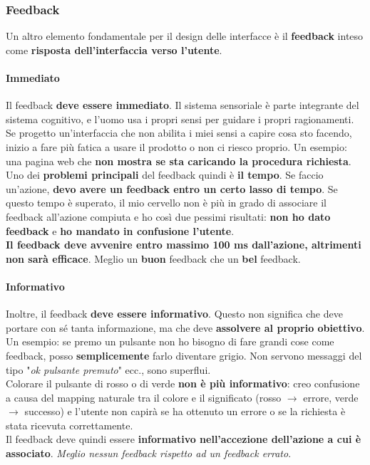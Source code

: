 \documentclass[10pt]{article}
\begin{document}
\subsubsection{Feedback}
Un altro elemento fondamentale per il design delle interfacce è il \textbf{feedback} inteso come \textbf{risposta dell'interfaccia verso l'utente}.
\paragraph{Immediato} Il feedback \textbf{deve essere immediato}. Il sistema sensoriale è parte integrante del sistema cognitivo, e l'uomo usa i propri sensi per guidare i propri ragionamenti. Se progetto un'interfaccia che non abilita i miei sensi a capire cosa sto facendo, inizio a fare più fatica a usare il prodotto o non ci riesco proprio. Un esempio: una pagina web che \textbf{non mostra se sta caricando la procedura richiesta}.\\
Uno dei \textbf{problemi principali} del feedback quindi è \textbf{il tempo}. Se faccio un'azione, \textbf{devo avere un feedback entro un certo lasso di tempo}. Se questo tempo è superato, il mio cervello non è più in grado di associare il feedback all'azione compiuta e ho così due pessimi risultati: \textbf{non ho dato feedback} e \textbf{ho mandato in confusione l'utente}.\\
\textbf{Il feedback deve avvenire entro massimo 100 ms dall'azione, altrimenti non sarà efficace}. Meglio un \textbf{buon} feedback che un \textbf{bel} feedback.
\paragraph{Informativo} Inoltre, il feedback \textbf{deve essere informativo}. Questo non significa che deve portare con sé tanta informazione, ma che deve \textbf{assolvere al proprio obiettivo}. Un esempio: se premo un pulsante non ho bisogno di fare grandi cose come feedback, posso \textbf{semplicemente} farlo diventare grigio. Non servono messaggi del tipo "\textit{ok pulsante premuto}" ecc., sono superflui.\\
Colorare il pulsante di rosso o di verde \textbf{non è più informativo}: creo confusione a causa del mapping naturale tra il colore e il significato (rosso $\rightarrow$ errore, verde $\rightarrow$ successo) e l'utente non capirà se ha ottenuto un errore o se la richiesta è stata ricevuta correttamente.\\
Il feedback deve quindi essere \textbf{informativo nell'accezione dell'azione a cui è associato}. \emph{Meglio nessun feedback rispetto ad un feedback errato}.
\end{document}
